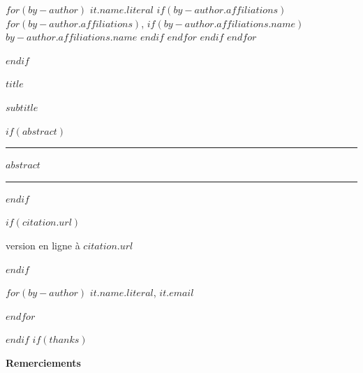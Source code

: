 \begin{titlepage}
\begin{minipage}{12.5cm}
  $for(by-author)$
    \textbf{$it.name.literal$}
    $if(by-author.affiliations)$
     $for(by-author.affiliations)$,
      $if(by-author.affiliations.name)$
       $by-author.affiliations.name$
      $endif$
     $endfor$
    $endif$
    \vspace{2mm}
   $endfor$ %
 \end{minipage}

$endif$
\newpage
\pagestyle{empty}
\newpage
\pagestyle{empty}

\LARGE\textbf{$title$}

\large\textbf{$subtitle$}

\vspace{1cm}

$if(abstract)$

\par\rule{\textwidth}{0.5pt}

$abstract$

\par\rule{\textwidth}{0.5pt}

$endif$

\vspace{1cm}

$if(citation.url)$

version en ligne à $citation.url$

$endif$

\vspace{1cm}

\begin{flushright}
$for(by-author)$
   \linespread{1}\small{\textbf{$it.name.literal$}}, {\small{$it.email$}}\par
$endfor$ %
\end{flushright}
$endif$
$if(thanks)$
\vspace{2.5cm}
\begin{minipage}[b]{40em}
  \textcolor{scporouge}{
    \textbf{Remerciements}}{

}
\end{minipage}
\end{titlepage}
